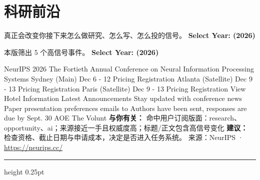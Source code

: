 \documentclass[10.5pt]{ctexart}
\begin{document}
\section*{科研前沿}
{\color{ormuted} 真正会改变你接下来怎么做研究、怎么写、怎么投的信号。}
\vspace{2mm}
{\LARGE\bfseries Select Year: (2026)}\par
\vspace{1mm}
{\color{ormuted} 本版筛出 5 个高信号事件。}
\vspace{3mm}
{\Large\bfseries Select Year: (2026)}\par
NeurIPS 2026 The Fortieth Annual Conference on Neural Information Processing Systems Sydney (Main) Dec 6 - 12 Pricing Registration Atlanta (Satellite) Dec 9 - 13 Pricing Registration Paris (Satellite) Dec 9 - 13 Pricing Registration View Hotel Information Latest Announcements Stay updated with conference news Paper presentation preferences emails to Authors have been sent, responses are due by Sept. 30 AOE The Volunt
\textbf{与你有关：} 命中用户订阅版面：research、opportunity、ai；来源接近一手且权威度高；标题/正文包含高信号变化
\textbf{建议：} 检查资格、截止日期与申请成本，决定是否进入任务系统。
{\footnotesize\color{ormuted} 来源：NeurIPS · \url{https://neurips.cc/}}
\vspace{4mm}
\hrule height 0.25pt
\vspace{3mm}
\end{document}
